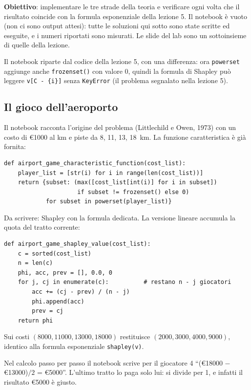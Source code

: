 \textbf{Obiettivo}: implementare le tre strade della teoria e verificare ogni volta che il
risultato coincide con la formula esponenziale della lezione 5. Il notebook è vuoto (non
ci sono output attesi): tutte le soluzioni qui sotto sono state scritte ed eseguite, e i
numeri riportati sono misurati. Le slide del lab sono un sottoinsieme di quelle della
lezione.

Il notebook riparte dal codice della lezione 5, con una differenza: ora \texttt{powerset}
aggiunge anche \texttt{frozenset()} con valore 0, quindi la formula di Shapley può leggere
\texttt{v[C - \{i\}]} senza \texttt{KeyError} (il problema segnalato nella lezione 5).

\subsection{Il gioco dell'aeroporto}

Il notebook racconta l'origine del problema (Littlechild e Owen, 1973) con un costo di
€1000 al km e piste da 8, 11, 13, 18~km. La funzione caratteristica è già fornita:
\begin{lstlisting}
def airport_game_characteristic_function(cost_list):
    player_list = [str(i) for i in range(len(cost_list))]
    return {subset: (max([cost_list[int(i)] for i in subset])
                     if subset != frozenset() else 0)
            for subset in powerset(player_list)}
\end{lstlisting}
Da scrivere: Shapley con la formula dedicata. La versione lineare accumula la quota del
tratto corrente:
\begin{lstlisting}
def airport_game_shapley_value(cost_list):
    c = sorted(cost_list)
    n = len(c)
    phi, acc, prev = [], 0.0, 0
    for j, cj in enumerate(c):          # restano n - j giocatori
        acc += (cj - prev) / (n - j)
        phi.append(acc)
        prev = cj
    return phi
\end{lstlisting}
Sui costi $(8000, 11000, 13000, 18000)$ restituisce $(2000, 3000, 4000, 9000)$, identico
alla formula esponenziale \texttt{shapley(v)}.

\begin{attenzione}
Nel calcolo passo per passo il notebook scrive per il giocatore 4
``(€18000 $-$ €13000)$/2$ = €5000''. L'ultimo tratto lo paga solo lui: si divide per 1, e
infatti il risultato €5000 è giusto.
\end{attenzione}

